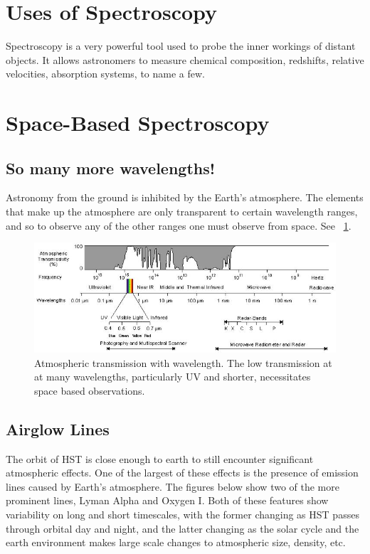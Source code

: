 \section{Uses of Spectroscopy}
Spectroscopy is a very powerful tool used to probe the inner workings of distant objects.  It allows astronomers to measure chemical composition, redshifts, relative velocities, absorption systems, to name a few.

\section{Space-Based Spectroscopy}
\subsection{So many more wavelengths!}
Astronomy from the ground is inhibited by the Earth's atmosphere.   The elements that make up the atmosphere are only transparent to certain wavelength ranges, and so to observe any of the other ranges one must observe from space. See ~\ref{fig:atmo_trans}.

\begin{center}
\begin{figure}[htbp]
\begin{center}
\includegraphics[scale=0.9, angle=0.0]{atmo_trans.jpg}
\caption{Atmospheric transmission with wavelength.  The low transmission at at many wavelengths, particularly UV and shorter, necessitates space based observations.}\label{fig:atmo_trans}
\end{center}
\end{figure}
\end{center}

\subsection{Airglow Lines}
The orbit of HST is close enough to earth to still encounter significant atmospheric effects.  One of the largest of these effects is the presence of emission lines caused by Earth's atmosphere.  The figures below show two of the more prominent lines, Lyman Alpha and Oxygen I.  Both of these features show variability on long and short timescales, with the former changing as HST passes through orbital day and night, and the latter changing as the solar cycle and the earth environment makes large scale changes to atmospheric size, density, etc.  

